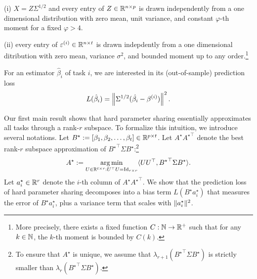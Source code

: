 \vspace{-0.05in}
(i) $X = Z \Sigma^{1/2}$ and every entry of $Z \in \mathbb{R}^{n \times p}$ is drawn independently from a one dimensional distribution with zero mean, unit variance, and constant $\varphi$-th moment for a fixed $\varphi > 4$.

\vspace{-0.05in}
(ii) every entry of $\varepsilon^{(i)} \in \mathbb{R}^{n \times t}$ is drawn indepdently from a one dimensional ditribution with zero mean, variance $\sigma^2$, and bounded moment up to any order.\footnote{More precisely, there exists a fixed function $C: \mathbb{N} \rightarrow \mathbb{R}^+$ such that for any $k \in \mathbb{N}$, the $k$-th moment is bounded by $C(k)$.}

For an estimator $\hat{\beta}_i$ of task $i$, we are interested in its (out-of-sample) prediction loss
\[ L(\hat{\beta}_i) = \left\| \Sigma^{1/2} (\hat{\beta_i} - \beta^{(i)}) \right\|^2. \]

Our first main result shows that hard parameter sharing essentially approximates all tasks through a rank-$r$ subspace.
To formalize this intuition, we introduce several notations.
Let $B^\star := [{\beta}_1,{\beta}_2,\dots,{\beta}_{t}] \in \mathbb{R}^{p\times t}$.
Let $A^{\star} {A^{\star}}^{\top}$ denote the best rank-$r$ subspace approximation of ${B^{\star}}^\top\Sigma B^{\star}$:\footnote{To ensure that $A^{\star}$ is unique, we assume that $\lambda_{r+1}({B^\star}^\top \Sigma B^\star)$ is strictly smaller than $\lambda_{r}({B^\star}^\top \Sigma B^\star)$.}
\[ A^{\star} := \operatorname*{arg\,min}_{U\in\mathbb{R}^{t\times r} : U^{\top} U = \operatorname{Id}_{r\times r}} \langle U U^{\top}, {B^{\star}}^{\top} \Sigma B^{\star} \rangle. \]
Let $a_i^{\star} \in\mathbb{R}^r$ denote the $i$-th column of $A^{\star}{A^{\star}}^{\top}$.
We show that the prediction loss of hard parameter sharing decomposes into a bias term $L(B^{\star} a_i^{\star})$ that measures the error of $B^{\star} a_i^{\star}$, plus a variance term that scales with $\|a_i^{\star}\|^2$.


